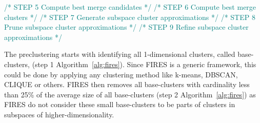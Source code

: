 \begin{algorithm}
	\DontPrintSemicolon
	\textcolor{teal}{/* STEP 5 Compute best merge candidates */\;}
	\textcolor{teal}{/* STEP 6 Compute best merge clusters */\;}
	\textcolor{teal}{/* STEP 7 Generate subspace cluster approximations */\;}
	\textcolor{teal}{/* STEP 8 Prune subspace cluster approximations */\;}
	\textcolor{teal}{/* STEP 9 Refine subspace cluster approximations */\;}
\end{algorithm}

The preclustering starts with identifying all 1-dimensional clusters, called base-clusters, (step 1 Algorithm~\ref{alg:fires}). Since FIRES is a generic framework, this could be done by applying any clustering method like k-means, DBSCAN, CLIQUE or others. FIRES then removes all base-clusters with cardinality less than 25\% of the average size of all base-clusters (step 2 Algorithm~\ref{alg:fires}) as FIRES do not consider these small base-clusters to be parts of clusters in subspaces of higher-dimensionality.

